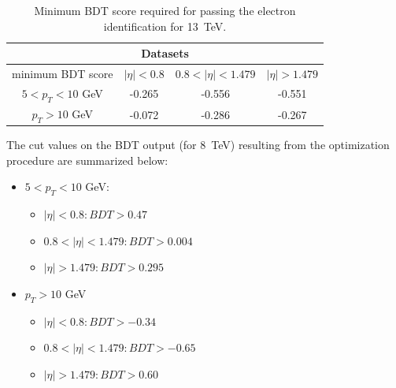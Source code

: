 

\begin{table}[h]
\scriptsize
    \centering
    \begin{tabular}{c|c c c}
\multicolumn{4}{|c|}{Datasets}                                                                \\
\hline %
minimum BDT score    &  $|\eta| < 0.8 $ & $0.8 < |\eta| < 1.479$        & $|\eta| > 1.479$      \\
\hline %
$ 5 < p_T < 10 $ GeV &  -0.265          & -0.556                & -0.551                \\
$p_T > 10$ GeV       &  -0.072          & -0.286                & -0.267                \\
\hline %
\hline %
     \end{tabular}
\small
    \caption{Minimum BDT score required for passing the electron identification  for 13~TeV.}
    \label{tab:ele_ID_WP}
\end{table}
The cut values on the BDT output (for 8~TeV) resulting from the optimization procedure are summarized below:
\begin{itemize}
\item $5 < p_T < 10 $ GeV:
\begin{itemize}
\item $|\eta| < 0.8: BDT > 0.47$
\item $0.8< |\eta| < 1.479: BDT > 0.004$
\item $|\eta| > 1.479: BDT > 0.295$
\end{itemize}
\item $ p_T > 10$ GeV
\begin{itemize}
\item $|\eta| < 0.8: BDT > -0.34$
\item $0.8 < |\eta| < 1.479: BDT > -0.65$
\item $|\eta| > 1.479: BDT > 0.60$
\end{itemize}
\end{itemize}
% 
% 
